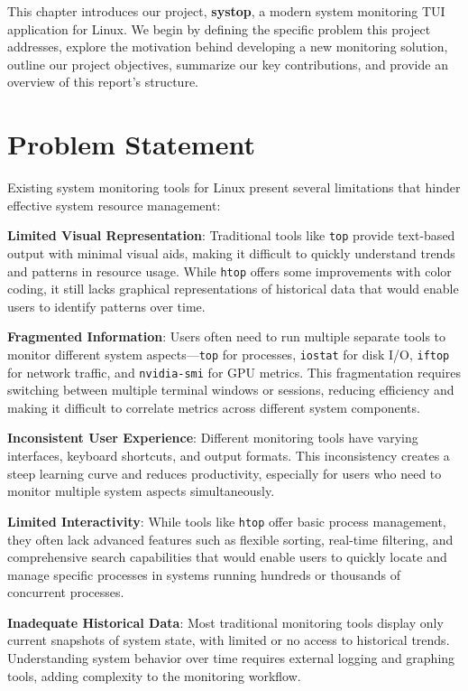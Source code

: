 \documentclass[12pt,a4paper,oneside]{report}
\begin{document}
This chapter introduces our project, \textbf{systop}, a modern system monitoring TUI application for Linux. We begin by defining the specific problem this project addresses, explore the motivation behind developing a new monitoring solution, outline our project objectives, summarize our key contributions, and provide an overview of this report's structure.

\section{Problem Statement}
\label{sec:problem-statement}

Existing system monitoring tools for Linux present several limitations that hinder effective system resource management:

\textbf{Limited Visual Representation}: Traditional tools like \texttt{top} provide text-based output with minimal visual aids, making it difficult to quickly understand trends and patterns in resource usage. While \texttt{htop} offers some improvements with color coding, it still lacks graphical representations of historical data that would enable users to identify patterns over time.

\textbf{Fragmented Information}: Users often need to run multiple separate tools to monitor different system aspects---\texttt{top} for processes, \texttt{iostat} for disk I/O, \texttt{iftop} for network traffic, and \texttt{nvidia-smi} for GPU metrics. This fragmentation requires switching between multiple terminal windows or sessions, reducing efficiency and making it difficult to correlate metrics across different system components.

\textbf{Inconsistent User Experience}: Different monitoring tools have varying interfaces, keyboard shortcuts, and output formats. This inconsistency creates a steep learning curve and reduces productivity, especially for users who need to monitor multiple system aspects simultaneously.

\textbf{Limited Interactivity}: While tools like \texttt{htop} offer basic process management, they often lack advanced features such as flexible sorting, real-time filtering, and comprehensive search capabilities that would enable users to quickly locate and manage specific processes in systems running hundreds or thousands of concurrent processes.

\textbf{Inadequate Historical Data}: Most traditional monitoring tools display only current snapshots of system state, with limited or no access to historical trends. Understanding system behavior over time requires external logging and graphing tools, adding complexity to the monitoring workflow.
\end{document}
